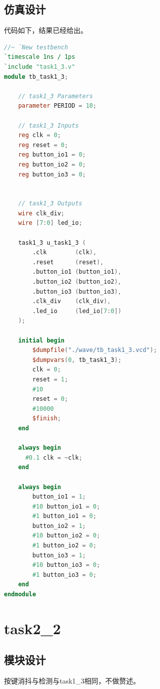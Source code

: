 \documentclass[UTF8]{ctexart}
\begin{document}
\subsection{仿真设计}
代码如下，结果已经给出。
\begin{framed}
    \begin{lstlisting}[language=verilog,style=verilogStyle]
//~ `New testbench
`timescale 1ns / 1ps
`include "task1_3.v"
module tb_task1_3;

    // task1_3 Parameters
    parameter PERIOD = 10;

    // task1_3 Inputs
    reg clk = 0;
    reg reset = 0;
    reg button_io1 = 0;
    reg button_io2 = 0;
    reg button_io3 = 0;


    // task1_3 Outputs
    wire clk_div;
    wire [7:0] led_io;
    
    task1_3 u_task1_3 (
        .clk        (clk),
        .reset      (reset),
        .button_io1 (button_io1),
        .button_io2 (button_io2),
        .button_io3 (button_io3),
        .clk_div    (clk_div),
        .led_io     (led_io[7:0])
    );

    initial begin
        $dumpfile("./wave/tb_task1_3.vcd");
        $dumpvars(0, tb_task1_3);
        clk = 0;
        reset = 1;
        #10
        reset = 0;
        #10000
        $finish;
    end

    always begin
      #0.1 clk = ~clk;
    end

    always begin
        button_io1 = 1;
        #10 button_io1 = 0;
        #1 button_io1 = 0;
        button_io2 = 1;
        #10 button_io2 = 0;
        #1 button_io2 = 0;
        button_io3 = 1;
        #10 button_io3 = 0;
        #1 button_io3 = 0;
    end
endmodule
    \end{lstlisting}
\end{framed}

\section{task2\_2}
\subsection{模块设计}
按键消抖与检测与task1\_3相同，不做赘述。
\end{document}
